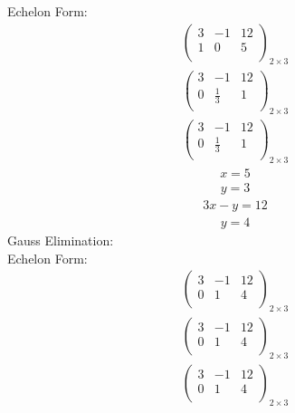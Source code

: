 \documentclass{article}
\begin{document}
Echelon Form:\\
\begin{align*}
\left(
\begin{array}{cc|c}
3 & -1 & 12\\
1 & 0 & 5\\
\end{array}
\right)_{2\times 3}
\end{align*}
\begin{align*}
\left(
\begin{array}{cc|c}
3 & -1 & 12\\
0 & \frac{1}{3} & 1\\
\end{array}
\right)_{2\times 3}
\end{align*}
\begin{align*}
\left(
\begin{array}{cc|c}
3 & -1 & 12\\
0 & \frac{1}{3} & 1\\
\end{array}
\right)_{2\times 3}
\end{align*}
\begin{align*}
x=5\end{align*}
\begin{align*}
y=3\end{align*}
\begin{align*}
3x - y=12\end{align*}
\begin{align*}
y=4\end{align*}
Gauss Elimination:\\
Echelon Form:\\
\begin{align*}
\left(
\begin{array}{cc|c}
3 & -1 & 12\\
0 & 1 & 4\\
\end{array}
\right)_{2\times 3}
\end{align*}
\begin{align*}
\left(
\begin{array}{cc|c}
3 & -1 & 12\\
0 & 1 & 4\\
\end{array}
\right)_{2\times 3}
\end{align*}
\begin{align*}
\left(
\begin{array}{cc|c}
3 & -1 & 12\\
0 & 1 & 4\\
\end{array}
\right)_{2\times 3}
\end{align*}
\end{document}
